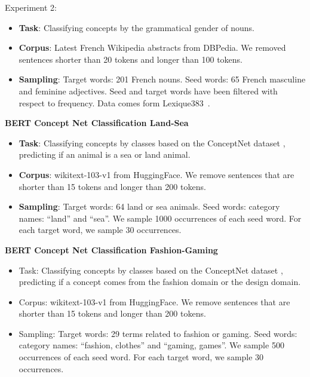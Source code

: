Experiment 2: 

\begin{itemize}
    \item \textbf{Task}: Classifying 
concepts by the grammatical gender of nouns.
\item \textbf{Corpus}: Latest French Wikipedia abstracts from DBPedia. We removed sentences shorter than 20 tokens and longer than 100 tokens.
\item \textbf{Sampling}: Target words: 201 French nouns. Seed words: 65 French masculine and feminine adjectives. Seed and target words have been filtered with respect to frequency. Data comes form Lexique383~\cite{npbf04}.
\end{itemize}


\textbf{BERT Concept Net Classification Land-Sea} 
\begin{itemize}
    \item \textbf{Task}: Classifying concepts by classes based on the ConceptNet dataset \cite{dalvi2022discovering}, predicting if an animal is a sea or land animal.
    \item \textbf{Corpus}: wikitext-103-v1 from HuggingFace. We remove sentences that are shorter than 15 tokens and longer than 200 tokens.
    \item \textbf{Sampling}: Target words: 64 land or sea animals. Seed words: category names: ``land'' and ``sea''. We sample 1000 occurrences of each seed word. For each target word, we sample 30 occurrences.
\end{itemize}

\textbf{BERT Concept Net Classification Fashion-Gaming} 

\begin{itemize}
    \item Task: Classifying concepts by classes based on the ConceptNet dataset \cite{dalvi2022discovering}, predicting if a concept comes from the fashion domain or the design domain.
    \item Corpus: wikitext-103-v1 from HuggingFace. We remove sentences that are shorter than 15 tokens and longer than 200 tokens.
    \item Sampling: Target words: 29 terms related to fashion or gaming. Seed words: category names: ``fashion, clothes'' and ``gaming, games''. We sample 500 occurrences of each seed word. For each target word, we sample 30 occurrences.
\end{itemize}


